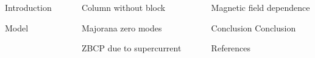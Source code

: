\documentclass[final]{beamer}
\newlength{\sepwid}
\newlength{\onecolwid}
\begin{document}
\begin{frame}[t]
\begin{columns}[t]
\begin{column}{\onecolwid}
\begin{block}{Introduction}
\end{block}


\begin{block}{Model}


\end{block}

\end{column} %


\begin{column}{\sepwid}\end{column} %

\begin{column}{\onecolwid} %
\rmfamily
\justify
Column without block
\begin{block}{Majorana zero modes}



\end{block}

\begin{block}{ZBCP due to supercurrent}
\end{block}



\end{column} %

\begin{column}{\sepwid}\end{column} %

\begin{column}{\onecolwid} %




\begin{block}{Magnetic field dependence}
\end{block}

\begin{block}{Conclusion}
Conclusion
\end{block}




\begin{block}{References}


\end{block}
\end{column}
\end{columns}
\end{frame}
\end{document}
